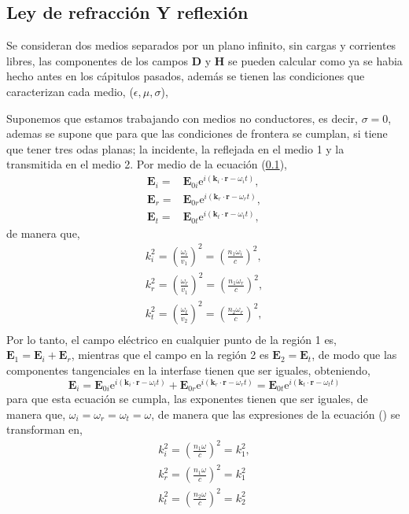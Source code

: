 \documentclass[11pt,fleqn]{book} %
\begin{document}
 \subsection{Ley de refracci\'on Y reflexi\'on}
 Se consideran dos medios separados por un plano infinito, sin cargas y corrientes libres, las componentes de los campos $\textbf{D}$ y $\textbf{H}$ se pueden calcular como ya se habia hecho antes en los c\'apitulos pasados, adem\'as se tienen las condiciones que caracterizan cada medio, ($\epsilon,\mu,\sigma$),

Suponemos que estamos trabajando con medios no conductores, es decir, $\sigma=0$, ademas se supone que para que las condiciones de frontera se cumplan, si tiene que tener tres odas planas; la incidente, la reflejada en el medio 1 y la transmitida en el medio 2. Por medio de la ecuaci\'on (\ref{}),
\begin{equation}
\begin{split}
\textbf{E}_i=&\textbf{E}_{0i}\text{e}^{i(\textbf{k}_i\cdot\textbf{r}-\omega_i t) },\\
\textbf{E}_r=&\textbf{E}_{0r}\text{e}^{i(\textbf{k}_r\cdot\textbf{r}-\omega_r t) },\\
\textbf{E}_t=&\textbf{E}_{0t}\text{e}^{i(\textbf{k}_t\cdot\textbf{r}-\omega_t t) },
\end{split}
\end{equation}
de manera que,
\begin{equation}
\begin{split}
k_i^2=\left(  \frac{\omega_i}{v_1} \right)^2=\left(  \frac{n_1\omega_i}{c} \right)^2,\\
k_r^2=\left(  \frac{\omega_r}{v_1} \right)^2=\left(  \frac{n_1\omega_r}{c} \right)^2,\\
k_t^2=\left(  \frac{\omega_t}{v_2} \right)^2=\left(  \frac{n_2\omega_r}{c} \right)^2,\\
\end{split}
\end{equation}
Por lo tanto, el campo el\'ectrico en cualquier punto de la regi\'on 1 es,  $\textbf{E}_1=\textbf{E}_i+\textbf{E}_r$, mientras que el campo en la regi\'on 2 es $\textbf{E}_2=\textbf{E}_t$, de modo que las componentes tangenciales en la interfase tienen que ser iguales, obteniendo,
\begin{equation}
\textbf{E}_i=\textbf{E}_{0i}\text{e}^{i(\textbf{k}_i\cdot\textbf{r}-\omega_i t) }+\textbf{E}_{0r}\text{e}^{i(\textbf{k}_r\cdot\textbf{r}-\omega_r t) }=\textbf{E}_{0t}\text{e}^{i(\textbf{k}_t\cdot\textbf{r}-\omega_t t) }
\end{equation}
para que esta ecuaci\'on se cumpla, las exponentes tienen que ser iguales, de manera que, $\omega_i=\omega_r=\omega_t=\omega$, de manera que las expresiones de la ecuaci\'on () se transforman en,
\begin{equation}
\begin{split}
k_i^2=\left(  \frac{n_1\omega}{c} \right)^2=k_1^2,\\
k_r^2=\left(  \frac{n_1\omega}{c} \right)^2=k_1^2\\      \label{Cuadra}
k_t^2=\left(  \frac{n_2\omega}{c} \right)^2=k_2^2\\
\end{split}
\end{equation}
\end{document}
